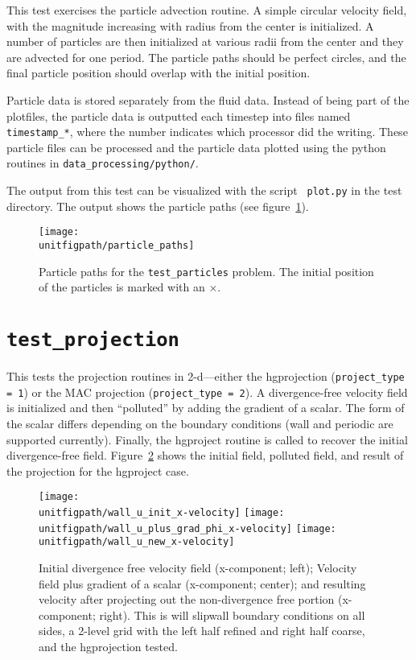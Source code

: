   This test exercises the particle advection routine.  A simple
  circular velocity field, with the magnitude increasing with radius
  from the center is initialized.  A number of particles are then
  initialized at various radii from the center and they are advected
  for one period.  The particle paths should be perfect circles, and
  the final particle position should overlap with the initial
  position.

  Particle data is stored separately from the fluid data.  Instead
  of being part of the plotfiles, the particle data is outputted
  each timestep into files named {\tt timestamp\_*}, where 
  the number indicates which processor did the writing.  These
  particle files can be processed and the particle data plotted
  using the python routines in {\tt data\_processing/python/}.

  The output from this test can be visualized with the script {\tt
  plot.py} in the test directory.  The output shows the particle
  paths (see figure~\ref{fig:unit:particles}).

\begin{figure}[t] 
\centering
\texttt{[image: \\unitfigpath/particle\_paths]} 
%
\caption[Particle paths for the {\tt test\_particles} problem]{\label{fig:unit:particles}
  Particle paths for the {\tt test\_particles} problem.  The initial
  position of the particles is marked with an $\times$.}
\end{figure}


\section {\tt test\_projection}

  This tests the projection routines in 2-d---either the hgprojection
  ({\tt project\_type = 1}) or the MAC projection ({\tt project\_type =
  2}).  A divergence-free velocity field is initialized and then
  ``polluted'' by adding the gradient of a scalar.  The form of the
  scalar differs depending on the boundary conditions (wall and
  periodic are supported currently).  Finally, the hgproject routine
  is called to recover the initial divergence-free field.
  Figure~\ref{fig:unit:projtest} shows the initial field, polluted
  field, and result of the projection for the hgproject case.

\begin{figure}[t] 
\centering
\texttt{[image: \\unitfigpath/wall\_u\_init\_x-velocity]} 
\texttt{[image: \\unitfigpath/wall\_u\_plus\_grad\_phi\_x-velocity]} 
\texttt{[image: \\unitfigpath/wall\_u\_new\_x-velocity]} 
%
\caption[Results of the {\tt test\_projection} unit test]{\label{fig:unit:projtest}
  Initial divergence free velocity field (x-component; left); Velocity field plus
  gradient of a scalar (x-component; center); and resulting velocity after projecting
  out the non-divergence free portion (x-component; right).  This is will slipwall
  boundary conditions on all sides, a 2-level grid with the left half refined and
  right half coarse, and the hgprojection tested.}
\end{figure}




